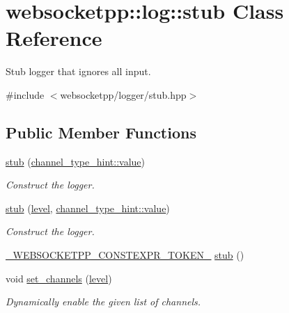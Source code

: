 \hypertarget{classwebsocketpp_1_1log_1_1stub}{}\section{websocketpp\+:\+:log\+:\+:stub Class Reference}
\label{classwebsocketpp_1_1log_1_1stub}


Stub logger that ignores all input.  




{\ttfamily \#include $<$websocketpp/logger/stub.\+hpp$>$}

\subsection*{Public Member Functions}
\begin{DoxyCompactItemize}
\item 
\hyperlink{classwebsocketpp_1_1log_1_1stub_ae28cf7e38cfb64008c4b5b3e90621ad9}{stub} (\hyperlink{structwebsocketpp_1_1log_1_1channel__type__hint_ad12a7f6555b71aabdc4cbec604dc89dd}{channel\+\_\+type\+\_\+hint\+::value})
\begin{DoxyCompactList}\small\item\em Construct the logger. \end{DoxyCompactList}\item 
\hyperlink{classwebsocketpp_1_1log_1_1stub_a45e96ad7f1a562c446645961d8d24784}{stub} (\hyperlink{namespacewebsocketpp_1_1log_a12d4d17939f102db8c9183d400a41960}{level}, \hyperlink{structwebsocketpp_1_1log_1_1channel__type__hint_ad12a7f6555b71aabdc4cbec604dc89dd}{channel\+\_\+type\+\_\+hint\+::value})
\begin{DoxyCompactList}\small\item\em Construct the logger. \end{DoxyCompactList}\item 
\hyperlink{boost__config_8hpp_a3dc3ece336a6149d2fe208a9daf66043}{\+\_\+\+W\+E\+B\+S\+O\+C\+K\+E\+T\+P\+P\+\_\+\+C\+O\+N\+S\+T\+E\+X\+P\+R\+\_\+\+T\+O\+K\+E\+N\+\_\+} \hyperlink{classwebsocketpp_1_1log_1_1stub_aa6ca247e5b1ba83c2c73858c6bf11a01}{stub} ()
\item 
void \hyperlink{classwebsocketpp_1_1log_1_1stub_acdaf1728646e2477cf7243b13f71e18d}{set\+\_\+channels} (\hyperlink{namespacewebsocketpp_1_1log_a12d4d17939f102db8c9183d400a41960}{level})
\begin{DoxyCompactList}\small\item\em Dynamically enable the given list of channels. \end{DoxyCompactList}\item 

\end{DoxyCompactItemize}
